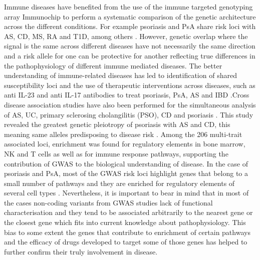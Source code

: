 Immune diseases have benefited from the use of the immune targeted genotyping array Immunochip to perform a systematic comparison of the genetic architecture across the different conditions. For example psoriasis and PsA share risk loci with AS, CD, MS, RA and T1D, among others \parencite{ImmunoBase}. However, genetic overlap where the signal is the same across different diseases have not necessarily the same direction and a risk allele for one can be protective for another reflecting true differences in the pathophysiology of different immune mediated diseases. The better understanding of immune-related diseases has led to identification of shared susceptibility loci and the use of therapeutic interventions across diseases, such as anti IL-23 and anti IL-17 antibodies to treat psoriasis, PsA, AS and IBD \parencite{Visscher2017}.Cross disease association studies have also been performed for the simultaneous analysis of AS, UC, primary sclerosing cholangilitis (PSO), CD and psoriasis \parencite{Ellinghaus2016}. This study revealed the greatest genetic pleiotropy of psoriasis with AS and CD, this meaning same alleles predisposing to disease risk \parencite{ImmunoBase}. Among the 206 multi-trait associated loci, enrichment was found for regulatory elements in bone marrow, NK and T cells as well as for immune response pathways, supporting the contribution of GWAS to the biological understanding of disease. In the case of psoriasis and PsA, most of the GWAS risk loci highlight genes that belong to a small number of pathways and they are enriched for regulatory elements of several cell types \parencite{Capon2017}. Nevertheless, it is important to bear in mind that in most of the cases non-coding variants from GWAS studies lack of functional characterisation and they tend to be associated arbitrarily to the nearest gene or the closest gene which fits into current knowledge about pathophysiology. This bias to some extent the genes that contribute to enrichment of certain pathways and the efficacy of drugs developed to target some of those genes has helped to further confirm their truly involvement in disease.

